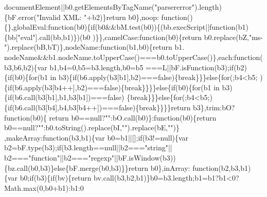 \begin{DoxyCode}
      documentElement||b0.getElementsByTagName(\textcolor{stringliteral}{"parsererror"}).length)\{bF.error(\textcolor{stringliteral}{"Invalid XML: "}+b2)\}\textcolor{keywordflow}{return} b0\},noop:\textcolor{keyword}{
      function}()\{\},globalEval:\textcolor{keyword}{function}(b0)\{\textcolor{keywordflow}{if}(b0&&bM.test(b0))\{(bb.execScript||\textcolor{keyword}{function}(b1)\{bb[\textcolor{stringliteral}{"eval"}].call(bb,b1)\})(b0
      )\}\},camelCase:\textcolor{keyword}{function}(b0)\{\textcolor{keywordflow}{return} b0.replace(bZ,\textcolor{stringliteral}{"ms-"}).replace(bB,bT)\},nodeName:\textcolor{keyword}{function}(b1,b0)\{\textcolor{keywordflow}{return} b1.
      nodeName&&b1.nodeName.toUpperCase()===b0.toUpperCase()\},each:\textcolor{keyword}{function}(b3,b6,b2)\{var b1,b4=0,b5=b3.length,b0=b5
      ===L||bF.isFunction(b3);\textcolor{keywordflow}{if}(b2)\{\textcolor{keywordflow}{if}(b0)\{\textcolor{keywordflow}{for}(b1 in b3)\{\textcolor{keywordflow}{if}(b6.apply(b3[b1],b2)===\textcolor{keyword}{false})\{\textcolor{keywordflow}{break}\}\}\}\textcolor{keywordflow}{else}\{\textcolor{keywordflow}{for}(;b4<b5;
      )\{\textcolor{keywordflow}{if}(b6.apply(b3[b4++],b2)===\textcolor{keyword}{false})\{\textcolor{keywordflow}{break}\}\}\}\}\textcolor{keywordflow}{else}\{\textcolor{keywordflow}{if}(b0)\{\textcolor{keywordflow}{for}(b1 in b3)\{\textcolor{keywordflow}{if}(b6.call(b3[b1],b1,b3[b1])===\textcolor{keyword}{false})
      \{\textcolor{keywordflow}{break}\}\}\}\textcolor{keywordflow}{else}\{\textcolor{keywordflow}{for}(;b4<b5;)\{\textcolor{keywordflow}{if}(b6.call(b3[b4],b4,b3[b4++])===\textcolor{keyword}{false})\{\textcolor{keywordflow}{break}\}\}\}\}\textcolor{keywordflow}{return} b3\},trim:bO?\textcolor{keyword}{function}(b0)\{\textcolor{keywordflow}{
      return} b0==null?\textcolor{stringliteral}{""}:bO.call(b0)\}:\textcolor{keyword}{function}(b0)\{\textcolor{keywordflow}{return} b0==null?\textcolor{stringliteral}{""}:b0.toString().replace(bI,\textcolor{stringliteral}{""}).replace(bE,\textcolor{stringliteral}{""})\}
      ,makeArray:\textcolor{keyword}{function}(b3,b1)\{var b0=b1||[];\textcolor{keywordflow}{if}(b3!=null)\{var b2=bF.type(b3);\textcolor{keywordflow}{if}(b3.length==null||b2===\textcolor{stringliteral}{"string"}||
      b2===\textcolor{stringliteral}{"function"}||b2===\textcolor{stringliteral}{"regexp"}||bF.isWindow(b3))\{bz.call(b0,b3)\}\textcolor{keywordflow}{else}\{bF.merge(b0,b3)\}\}\textcolor{keywordflow}{return} b0\},inArray:\textcolor{keyword}{
      function}(b2,b3,b1)\{var b0;\textcolor{keywordflow}{if}(b3)\{\textcolor{keywordflow}{if}(bv)\{\textcolor{keywordflow}{return} bv.call(b3,b2,b1)\}b0=b3.length;b1=b1?b1<0?Math.max(0,b0+b1):b1:0

\end{DoxyCode}
